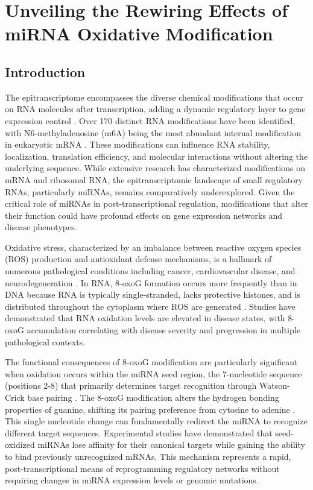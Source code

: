 \chapter{Unveiling the Rewiring Effects of miRNA Oxidative Modification}
\label{chp:unveiling-the-rewiring-effects-of-mirna}

\section{Introduction}

The epitranscriptome encompasses the diverse chemical modifications that occur on RNA molecules after transcription, adding a dynamic regulatory layer to gene expression control \cite{ruden2025uncoveri}. Over 170 distinct RNA modifications have been identified, with N6-methyladenosine (m6A) being the most abundant internal modification in eukaryotic mRNA \cite{huo2020methylad}. These modifications can influence RNA stability, localization, translation efficiency, and molecular interactions without altering the underlying sequence. While extensive research has characterized modifications on mRNA and ribosomal RNA, the epitranscriptomic landscape of small regulatory RNAs, particularly miRNAs, remains comparatively underexplored. Given the critical role of miRNAs in post-transcriptional regulation, modifications that alter their function could have profound effects on gene expression networks and disease phenotypes.

Oxidative stress, characterized by an imbalance between reactive oxygen species (ROS) production and antioxidant defense mechanisms, is a hallmark of numerous pathological conditions including cancer, cardiovascular disease, and neurodegeneration \cite{pizzino2017oxidativ}. In RNA, 8-oxoG formation occurs more frequently than in DNA because RNA is typically single-stranded, lacks protective histones, and is distributed throughout the cytoplasm where ROS are generated \cite{nie2013dependen}. Studies have demonstrated that RNA oxidation levels are elevated in disease states, with 8-oxoG accumulation correlating with disease severity and progression in multiple pathological contexts.

The functional consequences of 8-oxoG modification are particularly significant when oxidation occurs within the miRNA seed region, the 7-nucleotide sequence (positions 2-8) that primarily determines target recognition through Watson-Crick base pairing \cite{min2010target}. The 8-oxoG modification alters the hydrogen bonding properties of guanine, shifting its pairing preference from cytosine to adenine \cite{eom2023widespre}. This single nucleotide change can fundamentally redirect the miRNA to recognize different target sequences. Experimental studies have demonstrated that seed-oxidized miRNAs lose affinity for their canonical targets while gaining the ability to bind previously unrecognized mRNAs. This mechanism represents a rapid, post-transcriptional means of reprogramming regulatory networks without requiring changes in miRNA expression levels or genomic mutations.

